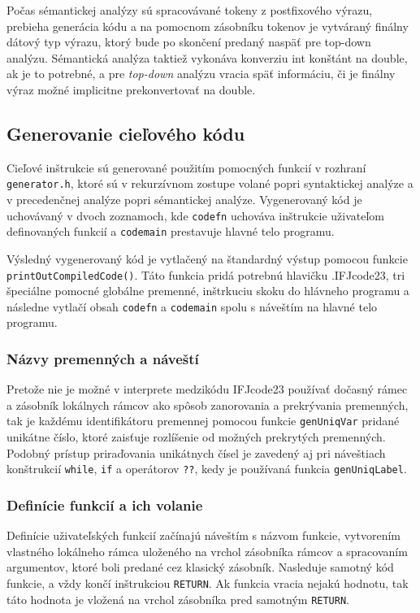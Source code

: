 \documentclass[a4paper,11pt]{article}
\begin{document}
Počas sémantickej analýzy sú spracovávané tokeny z postfixového výrazu, prebieha generácia kódu a na pomocnom zásobníku tokenov je vytváraný finálny dátový typ výrazu, ktorý bude po skončení predaný naspäť pre top-down analýzu. Sémantická analýza taktiež vykonáva konverziu int konštánt na double, ak je to potrebné, a pre \textit{top-down} analýzu vracia späť informáciu, či je finálny výraz možné implicitne prekonvertovať na double.

\subsection{Generovanie cieľového kódu}
Cieľové inštrukcie sú generované použitím pomocných funkcií v rozhraní \texttt{generator.h}, ktoré sú v rekurzívnom zostupe volané popri syntaktickej analýze a v precedenčnej analýze popri sémantickej analýze. Vygenerovaný kód je uchovávaný v dvoch zoznamoch, kde \texttt{code\textunderscore fn} uchováva inštrukcie uživateľom definovaných funkcií a \texttt{code\textunderscore main} prestavuje hlavné telo programu. 

Výsledný vygenerovaný kód je vytlačený na štandardný výstup pomocou funkcie \texttt{printOutCompiledCode()}. Táto funkcia pridá potrebnú hlavičku .IFJcode23, tri špeciálne pomocné globálne premenné, inštrkuciu skoku do hlávneho programu a následne vytlačí obsah \texttt{code\textunderscore fn} a \texttt{code\textunderscore main} spolu s náveštím na hlavné telo programu.

\subsubsection{Názvy premenných a náveští}
Pretože nie je možné v interprete medzikódu IFJcode23 používať dočasný rámec a zásobník lokálnych rámcov ako spôsob zanorovania a prekrývania premenných, tak je každému identifikátoru premennej pomocou funkcie \texttt{genUniqVar} pridané unikátne číslo, ktoré zaisťuje rozlíšenie od možných prekrytých premenných. Podobný prístup priraďovania unikátnych čísel je zavedený aj pri náveštiach konštrukcií \texttt{while}, \texttt{if} a operátorov \texttt{??}, kedy je používaná funkcia \texttt{genUniqLabel}.

\subsubsection{Definície funkcií a ich volanie}
Definície uživateľských funkcií začínajú náveštím s názvom funkcie, vytvorením vlastného lokálneho rámca uloženého na vrchol zásobníka rámcov a spracovaním argumentov, ktoré boli predané cez klasický zásobník. Nasleduje samotný kód funkcie, a vždy končí inštrukciou \texttt{RETURN}. Ak funkcia vracia nejakú hodnotu, tak táto hodnota je vložená na vrchol zásobníka pred samotným \texttt{RETURN}.
\end{document}
